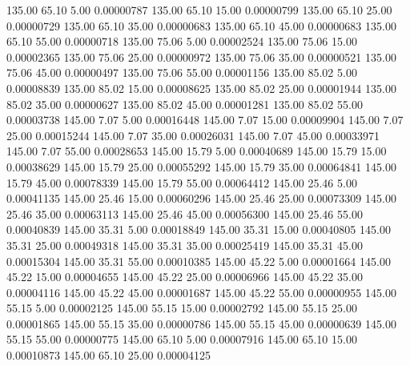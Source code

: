     135.00     65.10      5.00     0.00000787
    135.00     65.10     15.00     0.00000799
    135.00     65.10     25.00     0.00000729
    135.00     65.10     35.00     0.00000683
    135.00     65.10     45.00     0.00000683
    135.00     65.10     55.00     0.00000718
    135.00     75.06      5.00     0.00002524
    135.00     75.06     15.00     0.00002365
    135.00     75.06     25.00     0.00000972
    135.00     75.06     35.00     0.00000521
    135.00     75.06     45.00     0.00000497
    135.00     75.06     55.00     0.00001156
    135.00     85.02      5.00     0.00008839
    135.00     85.02     15.00     0.00008625
    135.00     85.02     25.00     0.00001944
    135.00     85.02     35.00     0.00000627
    135.00     85.02     45.00     0.00001281
    135.00     85.02     55.00     0.00003738
    145.00      7.07      5.00     0.00016448
    145.00      7.07     15.00     0.00009904
    145.00      7.07     25.00     0.00015244
    145.00      7.07     35.00     0.00026031
    145.00      7.07     45.00     0.00033971
    145.00      7.07     55.00     0.00028653
    145.00     15.79      5.00     0.00040689
    145.00     15.79     15.00     0.00038629
    145.00     15.79     25.00     0.00055292
    145.00     15.79     35.00     0.00064841
    145.00     15.79     45.00     0.00078339
    145.00     15.79     55.00     0.00064412
    145.00     25.46      5.00     0.00041135
    145.00     25.46     15.00     0.00060296
    145.00     25.46     25.00     0.00073309
    145.00     25.46     35.00     0.00063113
    145.00     25.46     45.00     0.00056300
    145.00     25.46     55.00     0.00040839
    145.00     35.31      5.00     0.00018849
    145.00     35.31     15.00     0.00040805
    145.00     35.31     25.00     0.00049318
    145.00     35.31     35.00     0.00025419
    145.00     35.31     45.00     0.00015304
    145.00     35.31     55.00     0.00010385
    145.00     45.22      5.00     0.00001664
    145.00     45.22     15.00     0.00004655
    145.00     45.22     25.00     0.00006966
    145.00     45.22     35.00     0.00004116
    145.00     45.22     45.00     0.00001687
    145.00     45.22     55.00     0.00000955
    145.00     55.15      5.00     0.00002125
    145.00     55.15     15.00     0.00002792
    145.00     55.15     25.00     0.00001865
    145.00     55.15     35.00     0.00000786
    145.00     55.15     45.00     0.00000639
    145.00     55.15     55.00     0.00000775
    145.00     65.10      5.00     0.00007916
    145.00     65.10     15.00     0.00010873
    145.00     65.10     25.00     0.00004125
